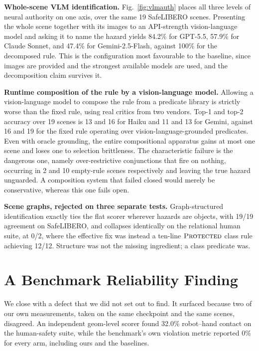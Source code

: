 \documentclass[conference]{IEEEtran}
\begin{document}
\textbf{Whole-scene VLM identification.} Fig.~\ref{fig:vlmauth} places all three levels of neural authority on one axis, over the same 19 SafeLIBERO scenes. Presenting the whole scene together with its images to an API-strength vision-language model and asking it to name the hazard yields 84.2\% for GPT-5.5, 57.9\% for Claude Sonnet, and 47.4\% for Gemini-2.5-Flash, against 100\% for the decomposed rule. This is the configuration most favourable to the baseline, since images are provided and the strongest available models are used, and the decomposition claim survives it.

\textbf{Runtime composition of the rule by a vision-language model.} Allowing a vision-language model to compose the rule from a predicate library is strictly worse than the fixed rule, using real critics from two vendors. Top-1 and top-2 accuracy over 19 scenes is 13 and 16 for Haiku and 11 and 13 for Gemini, against 16 and 19 for the fixed rule operating over vision-language-grounded predicates. Even with oracle grounding, the entire compositional apparatus gains at most one scene and loses one to selection brittleness. The characteristic failure is the dangerous one, namely over-restrictive conjunctions that fire on nothing, occurring in 2 and 10 empty-rule scenes respectively and leaving the true hazard unguarded. A composition system that failed closed would merely be conservative, whereas this one fails open.

\textbf{Scene graphs, rejected on three separate tests.} Graph-structured identification exactly ties the flat scorer wherever hazards are objects, with 19/19 agreement on SafeLIBERO, and collapses identically on the relational human suite, at 0/2, where the effective fix was instead a ten-line $\textsc{Protected}$ class rule achieving 12/12. Structure was not the missing ingredient; a class predicate was.

\section{A Benchmark Reliability Finding}
\label{sec:defect}

We close with a defect that we did not set out to find. It surfaced because two of our own measurements, taken on the same checkpoint and the same scenes, disagreed. An independent geom-level scorer found 32.0\% robot--hand contact on the human-safety suite, while the benchmark's own violation metric reported 0\% for every arm, including ours and the baselines.
\end{document}
